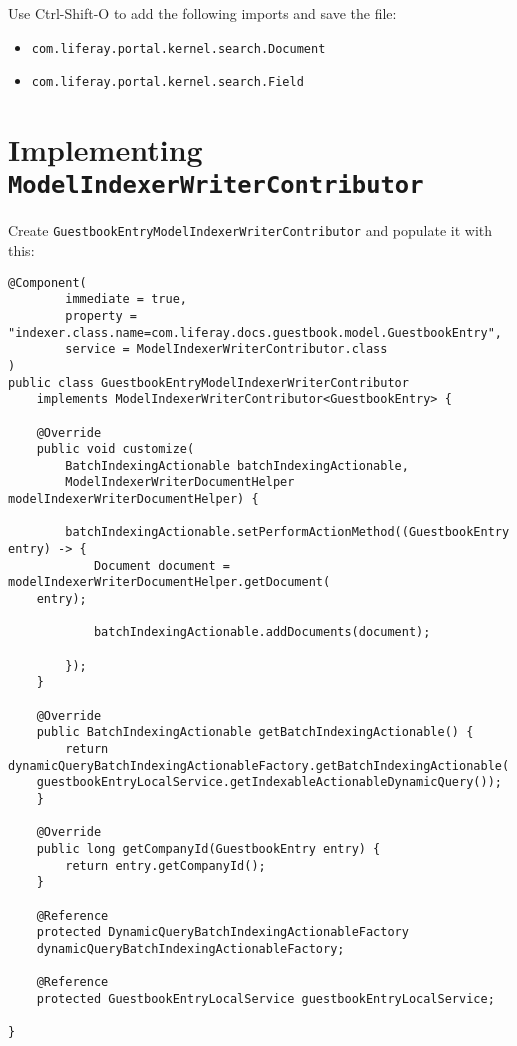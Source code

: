 Use Ctrl-Shift-O to add the following imports and save the file:

\begin{itemize}
\tightlist
\item
  \texttt{com.liferay.portal.kernel.search.Document}
\item
  \texttt{com.liferay.portal.kernel.search.Field}
\end{itemize}

\section{\texorpdfstring{Implementing
\texttt{ModelIndexerWriterContributor}}{Implementing ModelIndexerWriterContributor}}\label{implementing-modelindexerwritercontributor-1}

Create \texttt{GuestbookEntryModelIndexerWriterContributor} and populate
it with this:

\begin{verbatim}
@Component(
        immediate = true,
        property = "indexer.class.name=com.liferay.docs.guestbook.model.GuestbookEntry",
        service = ModelIndexerWriterContributor.class
)
public class GuestbookEntryModelIndexerWriterContributor
    implements ModelIndexerWriterContributor<GuestbookEntry> {

    @Override
    public void customize(
        BatchIndexingActionable batchIndexingActionable,
        ModelIndexerWriterDocumentHelper modelIndexerWriterDocumentHelper) {

        batchIndexingActionable.setPerformActionMethod((GuestbookEntry entry) -> {
            Document document = modelIndexerWriterDocumentHelper.getDocument(
    entry);

            batchIndexingActionable.addDocuments(document);
            
        });
    }

    @Override
    public BatchIndexingActionable getBatchIndexingActionable() {
        return dynamicQueryBatchIndexingActionableFactory.getBatchIndexingActionable(
    guestbookEntryLocalService.getIndexableActionableDynamicQuery());
    }

    @Override
    public long getCompanyId(GuestbookEntry entry) {
        return entry.getCompanyId();
    }

    @Reference
    protected DynamicQueryBatchIndexingActionableFactory
    dynamicQueryBatchIndexingActionableFactory;

    @Reference
    protected GuestbookEntryLocalService guestbookEntryLocalService;

}
\end{verbatim}

